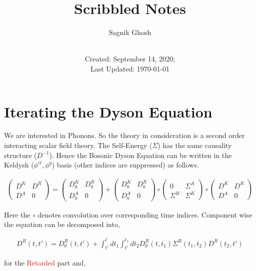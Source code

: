 \documentclass{amsart}
\title{Scribbled Notes}
\author{Sagnik Ghosh}
\date{\\Created: September 14, 2020;\\ Last Updated: \today}
\begin{document}
\maketitle

\section{Iterating the Dyson Equation}
    We are interested in Phonons. So the theory in consideration is a second order interacting scalar field theory. The Self-Energy ($\Sigma$) has the same causality structure ($D^{-1}$). Hence the Bosonic Dyson Equation can be written in the Keldysh ($\phi^{cl},\phi^{q}$) basis (other indices are suppressed) as follows.
    
    \begin{align}
        \begin{pmatrix}
            D^K & D^R \\
            D^A & 0
        \end{pmatrix}
        =
        \begin{pmatrix}
            D_0^K & D_0^R \\
            D_0^A & 0
        \end{pmatrix} 
        +\begin{pmatrix}
            D_0^K & D_0^R \\
            D_0^A & 0
        \end{pmatrix} 
        \circ\begin{pmatrix}
            0 & \Sigma^A \\
            \Sigma^R & \Sigma^K
        \end{pmatrix}
        \circ\begin{pmatrix}
            D^K & D^R \\
            D^A & 0
        \end{pmatrix} 
    \end{align}
    
    Here the $\circ$ denotes convolution over corresponding time indices. Component wise the equation can be decomposed into,
    
    \begin{align}\label{Retarded}
        D^R(t , t') = D_0^R(t, t') + \int^t_{t'} dt_1\int^{t_1}_{t'} dt_2 D_0^R(t, t_1) \Sigma^R (t_1,t_2) D^R(t_2, t')
    \end{align}
    
    for the \textcolor{red}{Retarded} part and,
    
\end{document}
